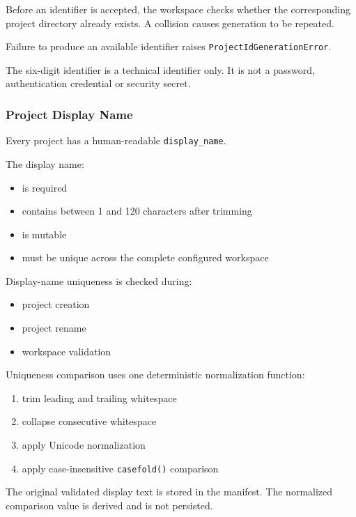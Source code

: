 Before an identifier is accepted, the workspace checks whether the corresponding project directory already exists. A collision causes generation to be repeated.

Failure to produce an available identifier raises \texttt{ProjectIdGenerationError}.

The six-digit identifier is a technical identifier only. It is not a password, authentication credential or security secret.

\hypertarget{project-display-name}{%
\subsubsection{Project Display Name}\label{project-display-name}}

Every project has a human-readable \texttt{display\_name}.

The display name:

\begin{itemize}
\tightlist
\item
  is required
\item
  contains between 1 and 120 characters after trimming
\item
  is mutable
\item
  must be unique across the complete configured workspace
\end{itemize}

Display-name uniqueness is checked during:

\begin{itemize}
\tightlist
\item
  project creation
\item
  project rename
\item
  workspace validation
\end{itemize}

Uniqueness comparison uses one deterministic normalization function:

\begin{enumerate}
\def\labelenumi{\arabic{enumi}.}
\tightlist
\item
  trim leading and trailing whitespace
\item
  collapse consecutive whitespace
\item
  apply Unicode normalization
\item
  apply case-insensitive \texttt{casefold()} comparison
\end{enumerate}

The original validated display text is stored in the manifest. The normalized comparison value is derived and is not persisted.

